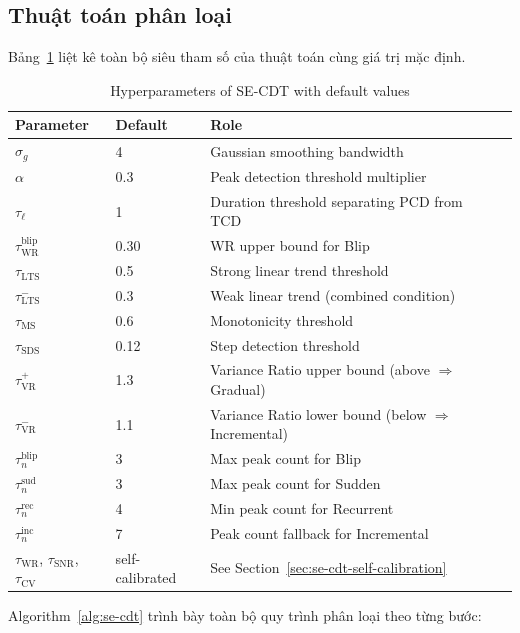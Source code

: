 \subsection{Thuật toán phân loại}

Bảng~\ref{tab:se-cdt-params} liệt kê toàn bộ siêu tham số của thuật toán cùng giá trị mặc định.

\begin{table}[H]
	\centering
	\caption{Hyperparameters of SE-CDT with default values}
	\label{tab:se-cdt-params}
	\begin{tabular}{llll}
		\hline
		\textbf{Parameter} & \textbf{Default} & \textbf{Role} \\
		\hline
		$\sigma_g$ & 4 & Gaussian smoothing bandwidth \\
		$\alpha$ & 0.3 & Peak detection threshold multiplier \\
		$\tau_{\ell}$ & 1 & Duration threshold separating PCD from TCD \\
		$\tau_{\mathrm{WR}}^{\mathrm{blip}}$ & 0.30 & WR upper bound for Blip \\
		$\tau_{\mathrm{LTS}}$ & 0.5 & Strong linear trend threshold \\
		$\tau_{\mathrm{LTS}}^{-}$ & 0.3 & Weak linear trend (combined condition) \\
		$\tau_{\mathrm{MS}}$ & 0.6 & Monotonicity threshold \\
		$\tau_{\mathrm{SDS}}$ & 0.12 & Step detection threshold \\
		$\tau_{\mathrm{VR}}^{+}$ & 1.3 & Variance Ratio upper bound (above $\Rightarrow$ Gradual) \\
		$\tau_{\mathrm{VR}}^{-}$ & 1.1 & Variance Ratio lower bound (below $\Rightarrow$ Incremental) \\
		$\tau_{n}^{\mathrm{blip}}$ & 3 & Max peak count for Blip \\
		$\tau_{n}^{\mathrm{sud}}$ & 3 & Max peak count for Sudden \\
		$\tau_{n}^{\mathrm{rec}}$ & 4 & Min peak count for Recurrent \\
		$\tau_{n}^{\mathrm{inc}}$ & 7 & Peak count fallback for Incremental \\
		$\tau_{\mathrm{WR}}$, $\tau_{\mathrm{SNR}}$, $\tau_{\mathrm{CV}}$ & self-calibrated & See Section~\ref{sec:se-cdt-self-calibration} \\
		\hline
	\end{tabular}
\end{table}

Algorithm~\ref{alg:se-cdt} trình bày toàn bộ quy trình phân loại theo từng bước:

